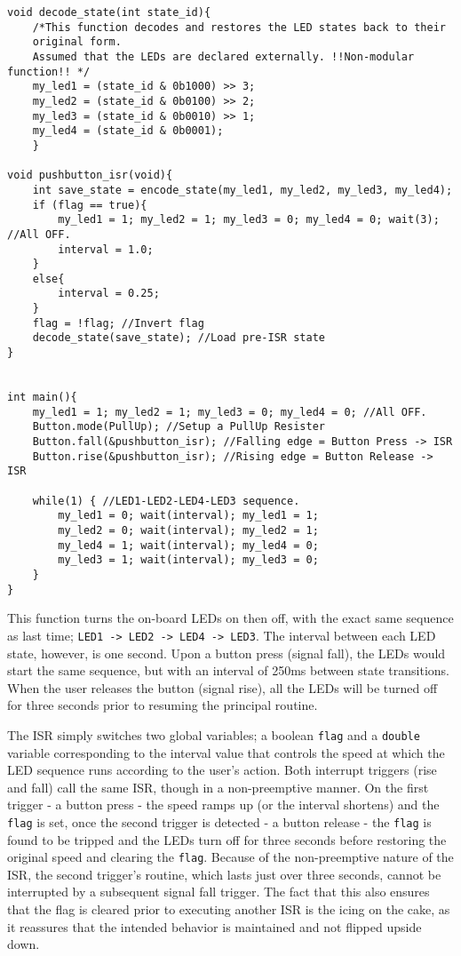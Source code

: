 \documentclass{article}
\begin{document}
\begin{verbatim}
void decode_state(int state_id){
    /*This function decodes and restores the LED states back to their
    original form.
    Assumed that the LEDs are declared externally. !!Non-modular function!! */
    my_led1 = (state_id & 0b1000) >> 3;
    my_led2 = (state_id & 0b0100) >> 2;
    my_led3 = (state_id & 0b0010) >> 1;
    my_led4 = (state_id & 0b0001);
    }

void pushbutton_isr(void){
    int save_state = encode_state(my_led1, my_led2, my_led3, my_led4);
    if (flag == true){
        my_led1 = 1; my_led2 = 1; my_led3 = 0; my_led4 = 0; wait(3); //All OFF.
        interval = 1.0;
    }
    else{
        interval = 0.25;
    }
    flag = !flag; //Invert flag
    decode_state(save_state); //Load pre-ISR state
}


int main(){
    my_led1 = 1; my_led2 = 1; my_led3 = 0; my_led4 = 0; //All OFF.
    Button.mode(PullUp); //Setup a PullUp Resister
    Button.fall(&pushbutton_isr); //Falling edge = Button Press -> ISR
    Button.rise(&pushbutton_isr); //Rising edge = Button Release -> ISR
    
    while(1) { //LED1-LED2-LED4-LED3 sequence.
        my_led1 = 0; wait(interval); my_led1 = 1;
        my_led2 = 0; wait(interval); my_led2 = 1;
        my_led4 = 1; wait(interval); my_led4 = 0;
        my_led3 = 1; wait(interval); my_led3 = 0;
    }
}
\end{verbatim}

This function turns the on-board LEDs on then off, with the exact same sequence as last time; \texttt{LED1 -> LED2 -> LED4 -> LED3}. The interval between each LED state, however, is one second. Upon a button press (signal fall), the LEDs would start the same sequence, but with an interval of 250ms between state transitions. When the user releases the button (signal rise), all the LEDs will be turned off for three seconds prior to resuming the principal routine.

The ISR simply switches two global variables; a boolean \texttt{flag} and a \texttt{double} variable corresponding to the interval value that controls the speed at which the LED sequence runs according to the user's action. Both interrupt triggers (rise and fall) call the same ISR, though in a non-preemptive manner. On the first trigger - a button press - the speed ramps up (or the interval shortens) and the \texttt{flag} is set, once the second trigger is detected - a button release - the \texttt{flag} is found to be tripped and the LEDs turn off for three seconds before restoring the original speed and clearing the \texttt{flag}. Because of the non-preemptive nature of the ISR, the second trigger's routine, which lasts just over three seconds, cannot be interrupted by a subsequent signal fall trigger. The fact that this also ensures that the flag is cleared prior to executing another ISR is the icing on the cake, as it reassures that the intended behavior is maintained and not flipped upside down.
\end{document}
